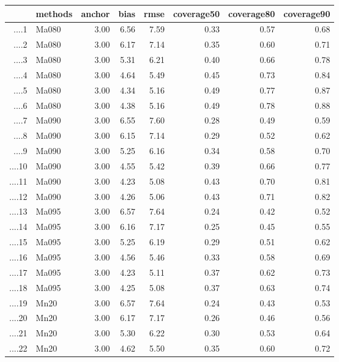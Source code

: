 \begin{table}[ht]
\centering
\begin{tabular}{rlrrrrrr}
  \hline
 & methods & anchor & bias & rmse & coverage50 & coverage80 & coverage90 \\ 
  \hline
....1 & Ma080 & 3.00 & 6.56 & 7.59 & 0.33 & 0.57 & 0.68 \\ 
  ....2 & Ma080 & 3.00 & 6.17 & 7.14 & 0.35 & 0.60 & 0.71 \\ 
  ....3 & Ma080 & 3.00 & 5.31 & 6.21 & 0.40 & 0.66 & 0.78 \\ 
  ....4 & Ma080 & 3.00 & 4.64 & 5.49 & 0.45 & 0.73 & 0.84 \\ 
  ....5 & Ma080 & 3.00 & 4.34 & 5.16 & 0.49 & 0.77 & 0.87 \\ 
  ....6 & Ma080 & 3.00 & 4.38 & 5.16 & 0.49 & 0.78 & 0.88 \\ 
  ....7 & Ma090 & 3.00 & 6.55 & 7.60 & 0.28 & 0.49 & 0.59 \\ 
  ....8 & Ma090 & 3.00 & 6.15 & 7.14 & 0.29 & 0.52 & 0.62 \\ 
  ....9 & Ma090 & 3.00 & 5.25 & 6.16 & 0.34 & 0.58 & 0.70 \\ 
  ....10 & Ma090 & 3.00 & 4.55 & 5.42 & 0.39 & 0.66 & 0.77 \\ 
  ....11 & Ma090 & 3.00 & 4.23 & 5.08 & 0.43 & 0.70 & 0.81 \\ 
  ....12 & Ma090 & 3.00 & 4.26 & 5.06 & 0.43 & 0.71 & 0.82 \\ 
  ....13 & Ma095 & 3.00 & 6.57 & 7.64 & 0.24 & 0.42 & 0.52 \\ 
  ....14 & Ma095 & 3.00 & 6.16 & 7.17 & 0.25 & 0.45 & 0.55 \\ 
  ....15 & Ma095 & 3.00 & 5.25 & 6.19 & 0.29 & 0.51 & 0.62 \\ 
  ....16 & Ma095 & 3.00 & 4.56 & 5.46 & 0.33 & 0.58 & 0.69 \\ 
  ....17 & Ma095 & 3.00 & 4.23 & 5.11 & 0.37 & 0.62 & 0.73 \\ 
  ....18 & Ma095 & 3.00 & 4.25 & 5.08 & 0.37 & 0.63 & 0.74 \\ 
  ....19 & Mn20 & 3.00 & 6.57 & 7.64 & 0.24 & 0.43 & 0.53 \\ 
  ....20 & Mn20 & 3.00 & 6.17 & 7.17 & 0.26 & 0.46 & 0.56 \\ 
  ....21 & Mn20 & 3.00 & 5.30 & 6.22 & 0.30 & 0.53 & 0.64 \\ 
  ....22 & Mn20 & 3.00 & 4.62 & 5.50 & 0.35 & 0.60 & 0.72 \\ 

\end{tabular}
\end{table}

